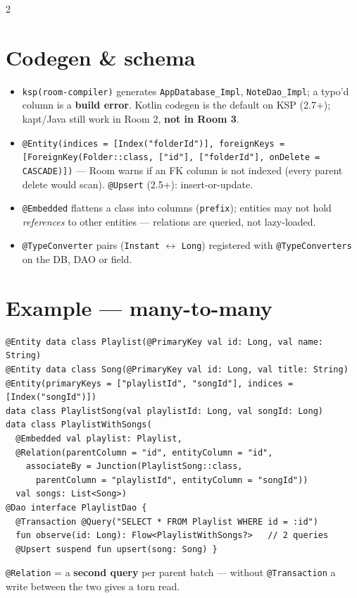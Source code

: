 \documentclass[8pt]{extarticle}
\begin{document}
\begin{multicols}{2}
\raggedright

\section{Codegen \& schema}
\begin{itemize}\raggedright
  \item \texttt{ksp(room-compiler)} generates \texttt{AppDatabase\_Impl}, \texttt{NoteDao\_Impl}; a
        typo'd column is a \textbf{build error}. Kotlin codegen is the default on KSP (2.7+);
        kapt/Java still work in Room 2, \textbf{not in Room 3}.
  \item \texttt{@Entity(indices = [Index("folderId")], foreignKeys = [ForeignKey(Folder::class,
        ["id"], ["folderId"], onDelete = CASCADE)])} — Room warns if an FK column is not
        indexed (every parent delete would scan). \texttt{@Upsert} (2.5+): insert-or-update.
  \item \texttt{@Embedded} flattens a class into columns (\texttt{prefix}); entities may not hold
        \emph{references} to other entities — relations are queried, not lazy-loaded.
  \item \texttt{@TypeConverter} pairs (\texttt{Instant} $\leftrightarrow$ \texttt{Long}) registered
        with \texttt{@TypeConverters} on the DB, DAO or field.
\end{itemize}

\section{Example — many-to-many}
\begin{lstlisting}[language=KotlinSheet]
@Entity data class Playlist(@PrimaryKey val id: Long, val name: String)
@Entity data class Song(@PrimaryKey val id: Long, val title: String)
@Entity(primaryKeys = ["playlistId", "songId"], indices = [Index("songId")])
data class PlaylistSong(val playlistId: Long, val songId: Long)
data class PlaylistWithSongs(
  @Embedded val playlist: Playlist,
  @Relation(parentColumn = "id", entityColumn = "id",
    associateBy = Junction(PlaylistSong::class,
      parentColumn = "playlistId", entityColumn = "songId"))
  val songs: List<Song>)
@Dao interface PlaylistDao {
  @Transaction @Query("SELECT * FROM Playlist WHERE id = :id")
  fun observe(id: Long): Flow<PlaylistWithSongs?>   // 2 queries
  @Upsert suspend fun upsert(song: Song) }
\end{lstlisting}
\raggedright \texttt{@Relation} = a \textbf{second query} per parent batch — without
\texttt{@Transaction} a write between the two gives a torn read.


\end{multicols}
\end{document}
